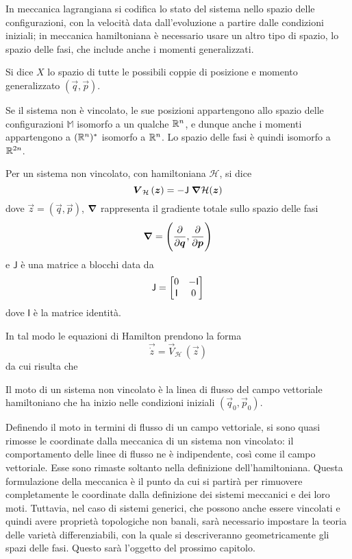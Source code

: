In meccanica lagrangiana si codifica lo stato del sistema nello spazio delle configurazioni, con la velocità data dall'evoluzione a partire dalle condizioni iniziali; in meccanica hamiltoniana è necessario usare un altro tipo di spazio, lo spazio delle fasi, che include anche i momenti generalizzati.
\begin{definition}
  Si dice  $X$ lo spazio di tutte le possibili coppie di posizione e momento generalizzato $(\vec{q},\vec{p})$.
\end{definition}
\begin{remark}
  Se il sistema non è vincolato, le sue posizioni appartengono allo spazio delle configurazioni $\mathbb{M}$ isomorfo a un qualche $\mathbb{R}^{n}$, e dunque anche i momenti appartengono a $(\mathbb{R}^{n})^*$ isomorfo a $\mathbb{R}^{n}$. Lo spazio delle fasi è quindi isomorfo a $\mathbb{R}^{2n}$.
\end{remark}

\begin{definition}
  Per un sistema non vincolato, con hamiltoniana $\mathcal{H}$, si dice  \begin{equation*}
    \boldsymbol{V}_{\mathcal{H}}\,(\boldsymbol{z}) = -\mathsf{J}\; \grad{\mathcal{H}} (\boldsymbol{z})
  \end{equation*}
  dove $\vec{z}=(\vec{q},\vec{p})$, $\grad$ rappresenta il gradiente totale sullo spazio delle fasi \begin{equation*}
    \grad = \Bigg(\pdv{\boldsymbol{q}},\pdv{\boldsymbol{p}}\Bigg) 
    \end{equation*}
    e $\mathsf{J}$ è una matrice a blocchi data da \begin{equation*}
    \mathsf{J} = \bmqty{0 & -\mathsf{I} \\ \mathsf{I} & 0}
    \end{equation*}
    dove $\mathsf{I}$ è la matrice identità.
\end{definition}

In tal modo le equazioni di Hamilton prendono la forma \begin{equation*}
\vec{\dot{z}} = \vec{V}_{\mathcal{H}}\, (\vec{z}) 
\end{equation*} 
da cui risulta che
\begin{theorem}
  Il moto di un sistema non vincolato è la linea di flusso del campo vettoriale hamiltoniano che ha inizio nelle condizioni iniziali $(\vec{q}_0, \vec{p}_0)$.
\end{theorem} 

Definendo il moto in termini di flusso di un campo vettoriale, si sono quasi rimosse le coordinate dalla meccanica di un sistema non vincolato: il comportamento delle linee di flusso ne è indipendente, così come il campo vettoriale. Esse sono rimaste soltanto nella definizione dell'hamiltoniana. Questa formulazione della meccanica è il punto da cui si partirà per rimuovere completamente le coordinate dalla definizione dei sistemi meccanici e dei loro moti. Tuttavia, nel caso di sistemi generici, che possono anche essere vincolati e quindi avere proprietà topologiche non banali, sarà necessario impostare la teoria delle varietà differenziabili, con la quale si descriveranno geometricamente gli spazi delle fasi. Questo sarà l'oggetto del prossimo capitolo.